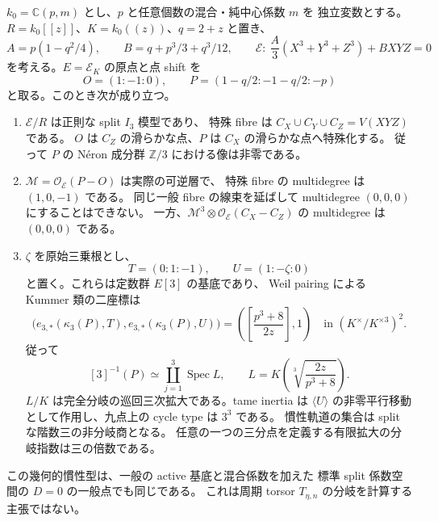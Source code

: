 \begin{proposition}
\label{prop:nfm-hesse-boundary-third-division}
$k_0=\mathbb C(p,m)$ とし、$p$ と任意個数の混合・純中心係数 $m$ を
独立変数とする。$R=k_0[[z]]$、$K=k_0((z))$、$q=2+z$ と置き、
\[
 A=p(1-q^2/4),\qquad B=q+p^3/3+q^3/12,
 \qquad
 \mathcal E:\ \frac A3(X^3+Y^3+Z^3)+BXYZ=0
\]
を考える。$E=\mathcal E_K$ の原点と点 shift を
\[
 O=(1:-1:0),\qquad P=(1-q/2:-1-q/2:-p)
\]
と取る。このとき次が成り立つ。
\begin{enumerate}
\item $\mathcal E/R$ は正則な split $I_3$ 模型であり、
特殊 fibre は $C_X\cup C_Y\cup C_Z=V(XYZ)$ である。
$O$ は $C_Z$ の滑らかな点、$P$ は $C_X$ の滑らかな点へ特殊化する。
従って $P$ の N\'eron 成分群 $\mathbb Z/3$ における像は非零である。
\item $\mathcal M=\mathcal O_{\mathcal E}(P-O)$ は実際の可逆層で、
特殊 fibre の multidegree は $(1,0,-1)$ である。
同じ一般 fibre の線束を延ばして multidegree $(0,0,0)$ にすることはできない。
一方、$\mathcal M^3\otimes\mathcal O_{\mathcal E}(C_X-C_Z)$ の
multidegree は $(0,0,0)$ である。
\item $\zeta$ を原始三乗根とし、
\[
 T=(0:1:-1),\qquad U=(1:-\zeta:0)
\]
と置く。これらは定数群 $E[3]$ の基底であり、
Weil pairing による Kummer 類の二座標は
\begin{equation}
 \label{eq:nfm-hesse-boundary-kummer-values}
 \bigl(e_{3,*}(\kappa_3(P),T),e_{3,*}(\kappa_3(P),U)\bigr)
   =\left(\left[\frac{p^3+8}{2z}\right],1\right)
   \quad\text{in }(K^\times/K^{\times3})^2.
\end{equation}
従って
\begin{equation}
 \label{eq:nfm-hesse-boundary-division-fields}
 [3]^{-1}(P)\simeq\coprod_{j=1}^{3}\operatorname{Spec}L,
 \qquad
 L=K\left(\sqrt[3]{\frac{2z}{p^3+8}}\right).
\end{equation}
$L/K$ は完全分岐の巡回三次拡大である。tame inertia は
$\langle U\rangle$ の非零平行移動として作用し、九点上の cycle type は $3^3$ である。
慣性軌道の集合は split な階数三の非分岐商となる。
任意の一つの三分点を定義する有限拡大の分岐指数は三の倍数である。
\end{enumerate}
この幾何的慣性型は、一般の active 基底と混合係数を加えた
標準 split 係数空間の $D=0$ の一般点でも同じである。
これは周期 torsor $T_{\eta,n}$ の分岐を計算する主張ではない。
\end{proposition}
